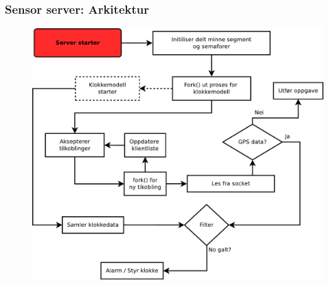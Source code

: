 \documentclass[xcolor=table]{beamer}
\begin{document}
\begin{frame}
  \frametitle{Sensor server: Arkitektur}
    \begin{figure}
      \includegraphics[scale=0.25]{thesis/graphics/csac_core_simplified.pdf}
    \end{figure}
\end{frame}
\end{document}
